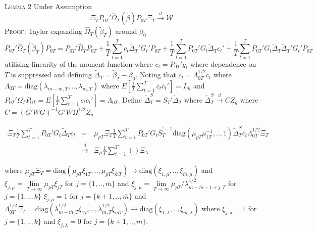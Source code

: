 \documentclass[11pt, fleqn]{article}
\begin{document}
\textsc{Lemma 2} Under Assumption 
\begin{equation*} \Xi_TP_{0T}'\hat{\Omega}_T(\tilde{\beta})P_{0T}\Xi_T\overset{d}{\rightarrow} \mathcal{W} \end{equation*}
\textsc{Proof:} Taylor expanding $\hat{\Omega}_T(\tilde{\beta}_T)$ around $\beta_0$ 
\begin{equation*}\label{expan}
P_{0T}'\hat{\Omega}_T(\tilde{\beta}_T)P_{0T}=  P_{0T}'\hat{\Omega}_TP_{0T}+ \frac{1}{T}\sum_{t=1}^Tc_{t}\tilde{\Delta}_T'G_t' P_{0T} +\frac{1}{T}\sum_{t=1}^T P_{0T}'G_t\tilde{\Delta}_T c_{t}'+\frac{1}{T}\sum_{t=1}^T P_{0T}'G_t\tilde{\Delta}_T\tilde{\Delta}_T' G_t'P_{0T} \end{equation*}
utilising linearity of the moment function where $c_{t}=P_{0T}'g_t$ where dependence on $T$ is suppressed and defining $\tilde{\Delta}_T=\tilde{\beta}_T-\beta_0$. Noting that $c_t=\Lambda_{0T}^{1/2}\bar{c}_t$ where $\Lambda_{0T}=\textrm{diag}(\lambda_{m-\bar{m},T},..,\lambda_{m,T})$ where $E\left[\frac{1}{T}\sum_{t=1}^T\bar{c}_t\bar{c}_t'\right]=I_{\bar{m}}$ and $P_{0T}'\Omega_TP_{0T}=E[\frac{1}{T}\sum_{t=1}^T c_t c_t']=\Lambda_{0T}$. Define $\tilde{\Delta}_T^S=S_T'\tilde{\Delta}_T$ where $\tilde{\Delta}_T^S\overset{d}{\rightarrow} CZ_g$ where $C=(G'WG)^{-1}G'W\Omega^{1/2}Z_g$

\begin{eqnarray*}
\Xi_T\frac{1}{T}\sum_{t=1}^T P_{0T}'G_t\tilde{\Delta}_Tc_t&=&\mu_{pT}\Xi_T\frac{1}{T}\sum_{t=1}^T P_{0T}'G_t\bar{S}_T^{'-1}\textrm{diag}(\mu_{pT}\mu_{1T}^{-1},..,1)\tilde{\Delta}_T^S\bar{c}_t\Lambda_{0T}^{1/2}\Xi_T\\
&\overset{d}{\rightarrow}& \Xi_{\mu}\frac{1}{T}\sum_{t=1}^T()  \Xi_{\lambda}
\end{eqnarray*}

where $\mu_{pT}\Xi_T=\textrm{diag}(\mu_{pT}\xi_{1T},..,\mu_{pT}\xi_{\bar{m}T})\rightarrow \textrm{diag}(\xi_{1,\mu},..,\xi_{\bar{m},\mu})$ and $\xi_{j,\mu}=\underset{T\rightarrow \infty}{\lim} \mu_{pT}\xi_{jT} $ for $j=\{1,..,\bar{m}\}$ and $\xi_{j,\mu}=\underset{T\rightarrow \infty}{\lim}\mu_{pT}/\lambda_{m-\bar{m}-1+j,T}^{1/2}$ for $j=\{1,..,k\}$ $\xi_{j,\mu}=1$ for $j=\{k+1,..,\bar{m}\}$ and  $\Lambda_{0T}^{1/2}\Xi_T=\textrm{diag}(\lambda_{m-\bar{m},T}^{1/2}\xi_{1T},..,\lambda_{m,T}^{1/2}\xi_{\bar{m}T})\rightarrow \textrm{diag}(\xi_{1,\lambda},..,\xi_{\bar{m},\lambda})$ where $\xi_{j,\lambda}=1$ for $j=\{1,..,k\}$ and $\xi_{j,\lambda}=0$ for $j=\{k+1,..,\bar{m}\}$.
\end{document}

